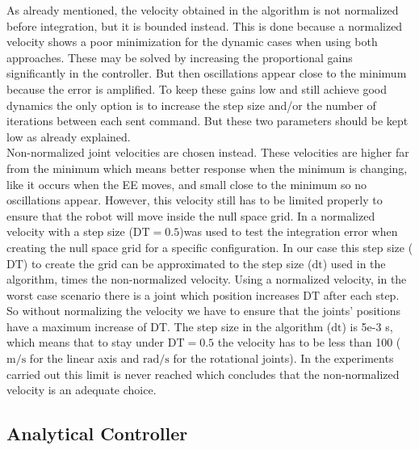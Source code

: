 As already mentioned, the velocity obtained in the algorithm is not normalized before  integration, but it is bounded instead. This is done because a normalized velocity shows a poor minimization for the dynamic cases when using both approaches. These may be solved by increasing the proportional gains significantly in the controller. But then  oscillations appear close to the minimum because the error is  amplified. To keep these gains low and still achieve good dynamics the only option is to increase the step size and/or the number of iterations between each sent command. But these two parameters should be kept low as already explained. \\
Non-normalized joint velocities are chosen instead. These velocities are higher far from the minimum which means better response when the minimum is changing, like it occurs when the EE moves, and small close to the minimum so no oscillations appear. However, this  velocity still has to be limited properly to ensure that the robot will move inside the null space grid.  In \cite{fabianthesis} a normalized velocity with a step size ($\mathrm{DT=0.5}$)was used to test the integration error when creating the null space grid for a specific configuration. 
In our case this step size ($\mathrm{DT}$) to create the grid can be approximated to the step size ($\mathrm{dt}$) used in the algorithm, times the non-normalized velocity. Using a normalized velocity, in the worst case scenario there is a joint which position increases $\mathrm{DT}$ after each step. So without normalizing the velocity we have to ensure that the joints' positions have a maximum increase of $\mathrm{DT}$.
The step size in the algorithm ($\mathrm{dt}$) is 5e-3 s, which means that to stay under $\mathrm{DT=0.5}$ the velocity has to be less than 100 ( $\mathrm{m/s}$ for the linear axis and $\mathrm{rad/s}$ for the rotational joints). In the experiments carried out this limit is never reached which concludes that the non-normalized velocity is an adequate choice. 


\subsection{Analytical Controller}


